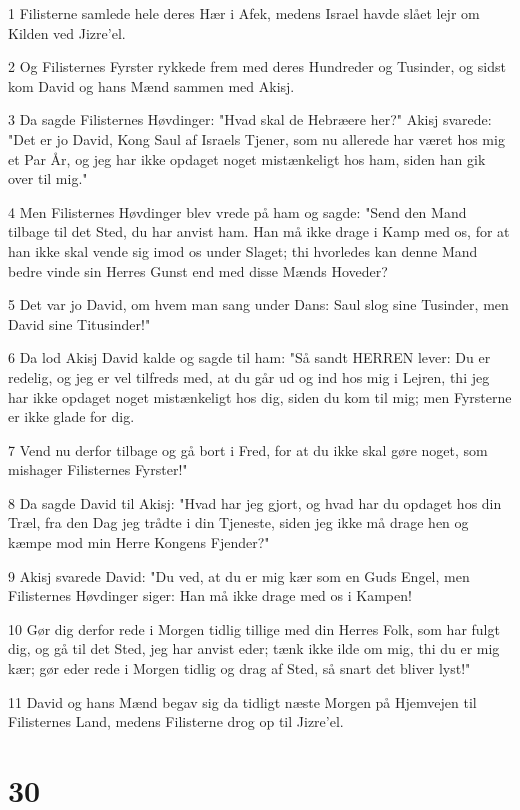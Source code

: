 \par 1 Filisterne samlede hele deres Hær i Afek, medens Israel havde slået lejr om Kilden ved Jizre'el.
\par 2 Og Filisternes Fyrster rykkede frem med deres Hundreder og Tusinder, og sidst kom David og hans Mænd sammen med Akisj.
\par 3 Da sagde Filisternes Høvdinger: "Hvad skal de Hebræere her?" Akisj svarede: "Det er jo David, Kong Saul af Israels Tjener, som nu allerede har været hos mig et Par År, og jeg har ikke opdaget noget mistænkeligt hos ham, siden han gik over til mig."
\par 4 Men Filisternes Høvdinger blev vrede på ham og sagde: "Send den Mand tilbage til det Sted, du har anvist ham. Han må ikke drage i Kamp med os, for at han ikke skal vende sig imod os under Slaget; thi hvorledes kan denne Mand bedre vinde sin Herres Gunst end med disse Mænds Hoveder?
\par 5 Det var jo David, om hvem man sang under Dans: Saul slog sine Tusinder, men David sine Titusinder!"
\par 6 Da lod Akisj David kalde og sagde til ham: "Så sandt HERREN lever: Du er redelig, og jeg er vel tilfreds med, at du går ud og ind hos mig i Lejren, thi jeg har ikke opdaget noget mistænkeligt hos dig, siden du kom til mig; men Fyrsterne er ikke glade for dig.
\par 7 Vend nu derfor tilbage og gå bort i Fred, for at du ikke skal gøre noget, som mishager Filisternes Fyrster!"
\par 8 Da sagde David til Akisj: "Hvad har jeg gjort, og hvad har du opdaget hos din Træl, fra den Dag jeg trådte i din Tjeneste, siden jeg ikke må drage hen og kæmpe mod min Herre Kongens Fjender?"
\par 9 Akisj svarede David: "Du ved, at du er mig kær som en Guds Engel, men Filisternes Høvdinger siger: Han må ikke drage med os i Kampen!
\par 10 Gør dig derfor rede i Morgen tidlig tillige med din Herres Folk, som har fulgt dig, og gå til det Sted, jeg har anvist eder; tænk ikke ilde om mig, thi du er mig kær; gør eder rede i Morgen tidlig og drag af Sted, så snart det bliver lyst!"
\par 11 David og hans Mænd begav sig da tidligt næste Morgen på Hjemvejen til Filisternes Land, medens Filisterne drog op til Jizre'el.

\chapter{30}

